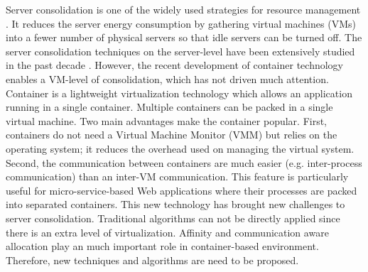 Server consolidation \cite{Zhang:2010vo} is one of the widely used strategies 
for resource management \cite{marinescu2013cloud}.
It reduces the server energy consumption by gathering virtual machines (VMs) into a fewer 
number of physical servers so that idle servers can be turned off. 
The server consolidation techniques on the server-level
have been extensively studied in the past decade \cite{}. 
However, the recent development of container technology enables a VM-level of consolidation, which 
has not driven much attention. 
Container is a lightweight virtualization
technology which allows an application running in a single container. 
Multiple containers can be packed in a single virtual machine. 
Two main advantages make the container popular. 
First, containers do not need a Virtual Machine Monitor (VMM) but relies on the operating system; 
it reduces the overhead used on managing the virtual system. 
Second, the communication \cite{} between containers are much 
easier (e.g. inter-process communication) than an inter-VM communication. This feature is 
particularly useful for micro-service-based Web applications where their processes are packed
into separated containers.
This new technology has brought new challenges to server consolidation. 
Traditional algorithms can not be directly applied since there is an extra level
of virtualization. Affinity and communication aware allocation play an much important role 
in container-based environment. Therefore, new techniques and algorithms are need to be proposed. 




